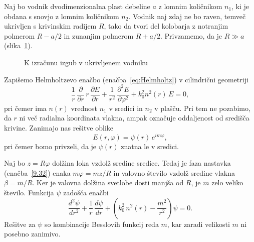 Naj bo vodnik dvodimenzionalna plast debeline $a$ z lomnim količnikom
$n_{1}$, ki je obdana s snovjo z lomnim količnikom $n_{2}$. Vodnik naj
zdaj ne bo raven, temveč ukrivljen s krivinskim radijem $R$, tako da tvori 
del kolobarja z notranjim polmerom $R-a/2$ in zunanjim polmerom $R+a/2$.
Privzamemo, da je $R\gg a$ (slika~\ref{fig:bend}). 
\begin{figure}[ht]
\centering
\def\svgwidth{50truemm} 
 
\caption{K izračunu izgub v ukrivljenem vodniku}
\label{fig:bend}
\end{figure}
Zapišemo Helmholtzevo enačbo (enačba~\ref{eq:Helmholtz}) v cilindrični 
geometriji
\begin{equation}
\frac{1}{r}\,\frac{\partial}{\partial r}\, r\,\frac{\partial E}{\partial r}
+\frac{1}{r^{2}}\,\frac{\partial^{2}E}{\partial\varphi^{2}}+k_{0}^{2}n^{2}\left(r\right)\, E=0,
\label{9.31}
\end{equation}
pri čemer ima $n\left(r\right)$ vrednost $n_{1}$ v sredici in $n_{2}$ v plašču. 
Pri tem ne pozabimo, da $r$ ni več radialna koordinata vlakna, ampak
označuje oddaljenost od središča krivine. Zanimajo nas rešitve oblike 
\begin{equation}
E(r, \varphi) =\psi\left(r\right)\, e^{im\varphi},
\label{9.32}
\end{equation}
pri čemer bomo privzeli, da je $\psi\left(r\right)$ znatna le v sredici. 

Naj bo $z=R\varphi$ dolžina loka vzdolž sredine sredice. Tedaj je faza nastavka
(enačba~\ref{9.32}) enaka $m\varphi = m z/R$ in valovno število vzdolž 
sredine vlakna $\beta = m/R$.
Ker je valovna dolžina svetlobe dosti manjša od $R$, je $m$ zelo veliko število. 
Funkcija $\psi$ zadošča enačbi 
\begin{equation}
\frac{d^{2}\psi}{dr^{2}}+\frac{1}{r}\,\frac{d\psi}{dr}+\left(k_{0}^{2}\, 
n^{2}\left(r\right)-\frac{m^{2}}{r^{2}}\right)\psi=0.
\label{9.33}
\end{equation}
Rešitve za $\psi$ so kombinacije Besslovih funkcij reda $m$, kar
zaradi velikosti $m$ ni posebno zanimivo. 

